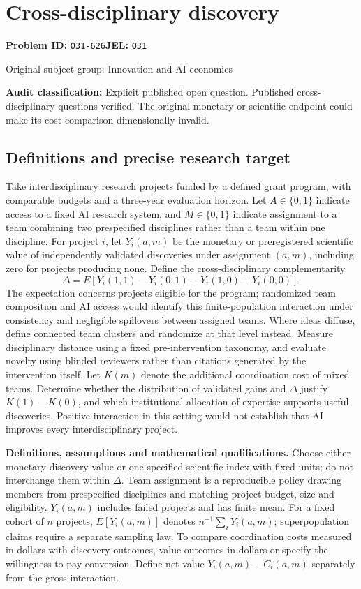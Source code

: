 \documentclass[11pt,a4paper]{article}
\begin{document}
\section*{Cross-disciplinary discovery}
\textbf{Problem ID:} \texttt{O31-626}\quad \textbf{JEL:} \texttt{O31}\par
\label{problem:OP-0411}
{\sffamily\small\color{muted}Original subject group: Innovation and AI economics\par}
\label{definitions:problem:30007693}
\textbf{Audit classification:} Explicit published open question. Published cross-disciplinary questions verified. The original monetary-or-scientific endpoint could make its cost comparison dimensionally invalid.
\subsection*{Definitions and precise research target}
Take interdisciplinary research projects funded by a defined grant program, with comparable budgets and a three-year evaluation horizon. Let \(A\in\{0,1\}\) indicate access to a fixed AI research system, and \(M\in\{0,1\}\) indicate assignment to a team combining two prespecified disciplines rather than a team within one discipline. For project \(i\), let \(Y_i(a,m)\) be the monetary or preregistered scientific value of independently validated discoveries under assignment \((a,m)\), including zero for projects producing none. Define the cross-disciplinary complementarity
\[
\Delta=E[Y_i(1,1)-Y_i(0,1)-Y_i(1,0)+Y_i(0,0)].
\]
The expectation concerns projects eligible for the program; randomized team composition and AI access would identify this finite-population interaction under consistency and negligible spillovers between assigned teams. Where ideas diffuse, define connected team clusters and randomize at that level instead. Measure disciplinary distance using a fixed pre-intervention taxonomy, and evaluate novelty using blinded reviewers rather than citations generated by the intervention itself. Let \(K(m)\) denote the additional coordination cost of mixed teams. Determine whether the distribution of validated gains and \(\Delta\) justify \(K(1)-K(0)\), and which institutional allocation of expertise supports useful discoveries. Positive interaction in this setting would not establish that AI improves every interdisciplinary project.

\textbf{Definitions, assumptions and mathematical qualifications.} Choose either monetary discovery value or one specified scientific index with fixed units; do not interchange them within \(\Delta\). Team assignment is a reproducible policy drawing members from prespecified disciplines and matching project budget, size and eligibility. \(Y_i(a,m)\) includes failed projects and has finite mean. For a fixed cohort of \(n\) projects, \(E[Y_i(a,m)]\) denotes \(n^{-1}\sum_iY_i(a,m)\); superpopulation claims require a separate sampling law. To compare coordination costs measured in dollars with discovery outcomes, value outcomes in dollars or specify the willingness-to-pay conversion. Define net value \(Y_i(a,m)-C_i(a,m)\) separately from the gross interaction.
\end{document}
